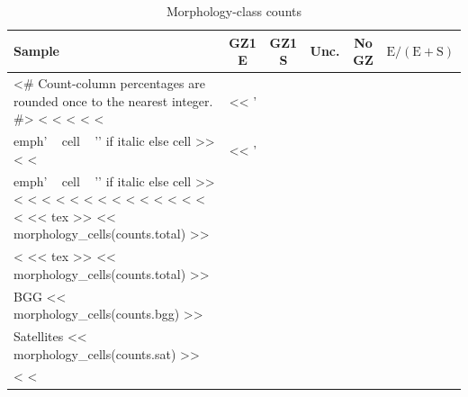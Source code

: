 \documentclass{aa}
\newcommand{\CB}{Control\textsubscript{4B}}
\newcommand{\CC}{Control\textsubscript{4C}}
\newcommand{\CG}{CG\textsubscript{4}}
\newcommand{\RG}{RG\textsubscript{4}}
\begin{document}
\begin{table}
    \centering
    \caption{Morphology-class counts}
    \label{tab:morphologies}
    \begin{tabular}{lrrrrr}
        \hline\hline
            Sample & \multicolumn{1}{c}{GZ1 E} & \multicolumn{1}{c}{GZ1 S} & \multicolumn{1}{c}{Unc.} & \multicolumn{1}{c}{No GZ} & \multicolumn{1}{c}{\(\mathrm{E}/(\mathrm{E}+\mathrm{S})\)} \\
            \hline
<# Count-column percentages are rounded once to the nearest integer. #>
<%
<%
<%
<%
<%
& << '\\emph{' ~ cell ~ '}' if italic else cell >> <%
<%
& << '\\emph{' ~ cell ~ '}' if italic else cell >>
<%
<%
<%
<%
<%
<%
<%
<%
<%
<%
<%
<%
<%
<%
<%
         \hline
            << tex >> << morphology_cells(counts.total) >> \\
<%
            \addlinespace[2pt]
            << tex >> << morphology_cells(counts.total) >> \\
             \quad BGG << morphology_cells(counts.bgg) >> \\
             \quad Satellites << morphology_cells(counts.sat) >> \\
<%
<%
        \hline
    \end{tabular}

\end{table}
\end{document}
